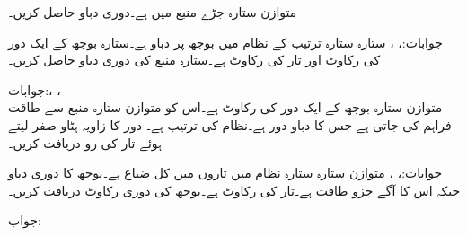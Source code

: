 متوازن  ستارہ جڑے منبع میں  ہے۔دوری دباو حاصل کریں۔

جوابات:، ، 
ستارہ ستارہ  ترتیب کے نظام میں بوجھ پر دباو  ہے۔ستارہ بوجھ کے ایک دور کی رکاوٹ  اور تار کی رکاوٹ  ہے۔ستارہ منبع کی دوری دباو حاصل کریں۔

جوابات:، ، \\ 
متوازن ستارہ بوجھ کے ایک دور کی رکاوٹ  ہے۔اس کو متوازن ستارہ منبع سے طاقت فراہم کی جاتی ہے جس کا دباو دور  ہے۔نظام کی ترتیب  ہے۔ دور  کا زاویہ ہٹاو صفر لیتے ہوئے تار کی رو دریافت کریں۔

جوابات:، ، 
متوازن ستارہ ستارہ نظام میں تاروں میں کل ضیاع  ہے۔بوجھ کا دوری دباو  جبکہ اس کا آگے جزو طاقت  ہے۔تار کی رکاوٹ  ہے۔بوجھ کی دوری رکاوٹ دریافت کریں۔

جواب:

